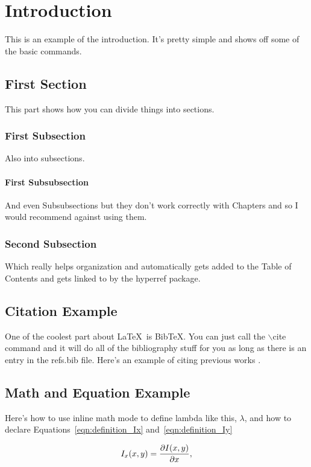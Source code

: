 \chapter{Introduction}
This is an example of the introduction. It's pretty simple and shows off
some of the basic commands.

\section{First Section}
This part shows how you can divide things into sections.

\subsection{First Subsection}
Also into subsections.

\subsubsection{First Subsubsection}
And even Subsubsections but they don't work correctly with Chapters and so I
would recommend against using them.

\subsection{Second Subsection}
Which really helps organization and automatically gets added to the Table
of Contents and gets linked to by the hyperref package.

\section{Citation Example}
One of the coolest part about \LaTeX\ is BibTeX. You can just call
the $\backslash$cite command and it will do all of the bibliography
stuff for you as long as there is an entry in the refs.bib file.
Here's an example of citing previous works
\cite{SomeSweetBook06,SomeSweetArticle06}.

\section{Math and Equation Example}
Here's how to use inline math mode to define lambda like this,
$\lambda$, and how to declare Equations~\eqref{eqn:definition_Ix}
and~\eqref{eqn:definition_Iy}

\begin{equation} \label{eqn:definition_Ix}
I_x(x,y) = \pd{I(x,y)}{x},
\end{equation}

